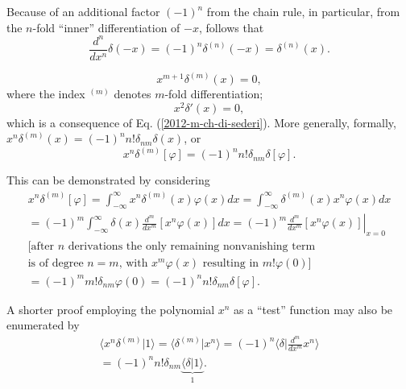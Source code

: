 Because of an additional factor $(-1)^n$ from the chain rule,
in particular, from the $n$-fold ``inner'' differentiation of $-x$, follows that
 \begin{equation}
 \frac{d^n}{dx^n}\delta(-x) = (-1)^n \delta^{(n)}(-x)  = \delta^{(n)}(x).
 \end{equation}

 \begin{equation}
 x^{m+1}\delta^{(m)}(x)=0
,
 \end{equation}
 where the index $^{(m)}$ denotes $m$-fold differentiation;
 \begin{equation}
 x^2\delta '(x)=0,
 \end{equation}
which is a  consequence of Eq. (\ref{2012-m-ch-di-sederi}).
More generally,
formally, $
x^n\delta^{(m)}(x) =  (-1)^n n! \delta_{nm}\delta (x)
$, or
 \begin{equation}
x^n\delta^{(m)} [\varphi ] =  (-1)^n n! \delta_{nm}\delta [\varphi ]
.
 \end{equation}
{\color{OliveGreen} \bproof
This can be demonstrated by considering
 \begin{equation}
 \begin{split}
x^n\delta^{(m)}[\varphi ]
=
\int_{-\infty}^\infty   x^n \delta^{(m)}(x)\varphi (x) dx
=
\int_{-\infty}^\infty  \delta^{(m)}(x) x^n \varphi (x) dx
\\
=
(-1)^m
\int_{-\infty}^\infty  \delta(x)\frac{d^m}{dx^m} \left[x^n\varphi (x)\right] dx
=
(-1)^m
\left.  \frac{d^m}{dx^m} \left[x^n\varphi (x)\right] \right|_{x=0}\\
\textrm{[after $n$ derivations
the only remaining nonvanishing term}\\
\textrm{is of degree $n=m$, with $x^m\varphi (x)$ resulting in $m! \varphi (0)$]}\\
=
(-1)^m  m! \delta_{nm}  \varphi (0)
=
(-1)^n  n! \delta_{nm} \delta [\varphi ].
\end{split}
\end{equation}

A shorter proof employing the polynomial $x^n$ as a ``test'' function may also be enumerated by
\begin{equation}
 \begin{split}
 \langle x^n \delta^{(m)} \vert 1 \rangle
=
 \langle \delta^{(m)} \vert  x^n \rangle
=
(-1)^n
 \langle \delta \vert \frac{d^m}{d x^m}  x^n \rangle    \\
=
(-1)^n n! \delta_{nm}
 \underbrace{\langle \delta \vert 1 \rangle}_{1}
  .
\end{split}
 \end{equation}
\eproof
}


